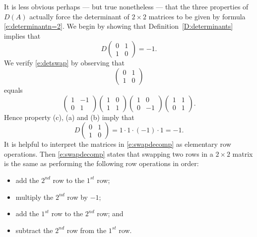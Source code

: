 \documentclass{ximera}
\begin{document}
It is less obvious perhaps --- but true nonetheless --- that the
three properties of $D(A)$ actually force the determinant of
$2\times 2$ matrices to be given by formula
\eqref{e:determinantn=2}. We begin by showing that
Definition~\ref{D:determinants} implies that 
\begin{equation}  \label{e:detswap}
D\left(\begin{array}{cc} 0 & 1\\1 & 0 \end{array}\right)=-1.
\end{equation}
We verify \eqref{e:detswap} by observing that 
\begin{equation*}
  \left(\begin{array}{cc} 0 & 1\\1 & 0 \end{array}\right)
\end{equation*}
equals
\begin{equation}\label{e:swapdecomp}
\left(\begin{array}{cr} 1 & -1\\0 & 1 \end{array}\right)
\left(\begin{array}{cc} 1 & 0\\1 & 1 \end{array}\right)
\left(\begin{array}{cr} 1 & 0\\0 & -1 \end{array}\right)
\left(\begin{array}{cc} 1 & 1\\0 & 1 \end{array}\right).
\end{equation}
Hence property (c), (a) and (b) imply that
\[
D \left(\begin{array}{cc} 0 & 1\\1 & 0 \end{array}\right) =
1\cdot 1\cdot (-1) \cdot 1 = -1.
\]
It is helpful to interpret the matrices in \eqref{e:swapdecomp} as
elementary row operations.  
Then \eqref{e:swapdecomp} states that
swapping two rows in a $2\times 2$ matrix is the same as
performing the following row operations in order:
\begin{itemize}
\item        add the $2^{nd}$ row to the  $1^{st}$ row;
\item        multiply the $2^{nd}$ row by $-1$; 
\item        add the $1^{st}$ row to the $2^{nd}$ row; and  
\item        subtract the $2^{nd}$ row from the $1^{st}$ row.
\end{itemize}
 
\end{document}
